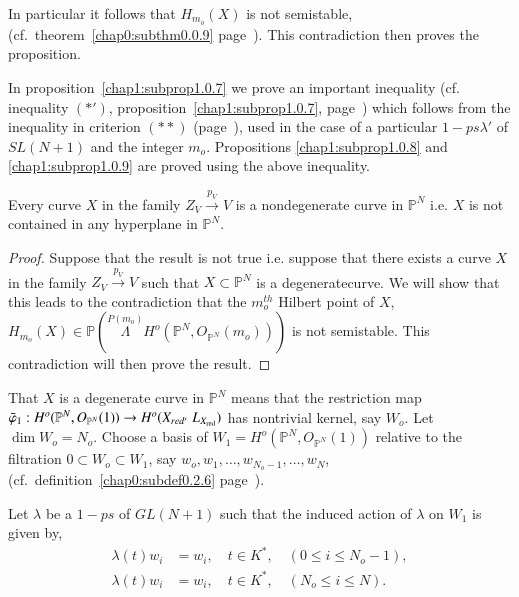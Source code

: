  
 \noindent
 In particular it follows that $H_{m_o}(X)$ is not semistable,
 (cf.\ theorem~\ref{chap0:subthm0.0.9} page~\pageref{chap0:subthm0.0.9}). 
This contradiction then proves the proposition. 
 
 In proposition~\ref{chap1:subprop1.0.7} we prove an important inequality (cf.
 inequality $(*')$, proposition~\ref{chap1:subprop1.0.7}, 
 page~\pageref{chap1:subprop1.0.7}) which follows from 
 the inequality in criterion $(**)$ (page~\pageref{page10}), used in the case of a
 particular $1-ps \lambda'$ of $SL(N+1)$ and the integer
 $m_o$. Propositions \ref{chap1:subprop1.0.8} and
 \ref{chap1:subprop1.0.9} are proved using the above 
 inequality. 
 
\setcounter{subprop}{1}
 \begin{subprop}\label{chap1:subprop1.0.2} %
Every curve $X$ in the family $Z_V \xrightarrow{p_V}V$ is a
nondegenerate curve in $\mathbb{P}^N$ i.e. $X$ is not contained in any
hyperplane in $\mathbb{P}^N$. 
\end{subprop}  
 
\begin{proof}
Suppose that the result is not true i.e. suppose that there exists a
curve $X$ in the family $Z_V \xrightarrow{p_V} V$ such that $X \subset
\mathbb{P}^N$ is a  degenerate\pageoriginale curve. We will show that
this leads to 
the contradiction that the $m_o^{th}$ Hilbert point of $X$,
$H_{m_o}(X) \in \mathbb{P}(\overset{P(m_o)} \Lambda H^o (
\mathbb{P}^N, O_{\mathbb{P}^N}(m_o)))$ is not semistable. This
contradiction will then prove the result. 
\end{proof}

That $X$ is a degenerate curve in $\mathbb{P}^N$ means that the
restriction map $\bar{\varphi}_1 : H^o ( \mathbb{P}^N ,
O_{\mathbb{P}^N}(1)) \to H^o( X_{red'} \; L_{X_{\rm red}})$ has nontrivial 
kernel, say $W_o$. Let $\dim W_o = N_o$. Choose a basis of $W_1 = H^o (
\mathbb{P}^N , O_{\mathbb{P}^N}(1))$ relative to the filtration $0
\subset W_o \subset W_1$, say $w_o, w_1, \ldots , w_{N_o -1}, \ldots
, w_N$, (cf.\ definition~\ref{chap0:subdef0.2.6} 
page~\pageref{chap0:subdef0.2.6}).   

Let $\lambda$ be a $1-ps$ of $GL(N+1)$ such that the induced action of
$\lambda$ on $W_1$ is given by,  
\begin{align*}
\lambda(t)w_i & = w_i, \quad t \in K^*, \quad (0 \le i \le N_o -1),\\
\lambda(t)w_i & = w_i, \quad t \in K^*, \quad (N_o \le i \le N).
\end{align*}

